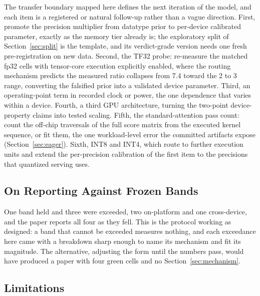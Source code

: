 \documentclass[conference]{IEEEtran}
\begin{document}
The transfer boundary mapped here defines the next iteration of the model,
and each item is a registered or natural follow-up rather than a vague
direction. First, promote the precision multiplier from datatype prior to
per-device calibrated parameter, exactly as the memory tier already is; the
exploratory split of Section~\ref{sec:split} is the template, and its
verdict-grade version needs one fresh pre-registration on new data. Second,
the TF32 probe: re-measure the matched fp32 cells with tensor-core execution
explicitly enabled, where the routing mechanism predicts the measured ratio
collapses from 7.4 toward the 2 to 3 range, converting the falsified prior
into a validated device parameter. Third, an operating-point term in recorded clock or power, the one
dependence that varies within a device. Fourth, a third GPU architecture,
turning the two-point device-property claims into tested scaling. Fifth,
the standard-attention pass count: count the off-chip traversals of the
full score matrix from the executed kernel sequence, or fit them, the one
workload-level error the committed artifacts expose
(Section~\ref{sec:eager}). Sixth, INT8 and INT4, which route to further
execution units and extend the per-precision calibration of the first item
to the precisions that quantized serving uses.

\subsection{On Reporting Against Frozen Bands}

One band held and three were exceeded, two on-platform and one
cross-device, and the paper reports all four as they fell. This is the protocol working as designed: a band that cannot be
exceeded measures nothing, and each exceedance here came with a breakdown
sharp enough to name its mechanism and fit its magnitude. The alternative,
adjusting the form until the numbers pass, would have produced a paper with
four green cells and no Section~\ref{sec:mechanism}.

\subsection{Limitations}
\end{document}
